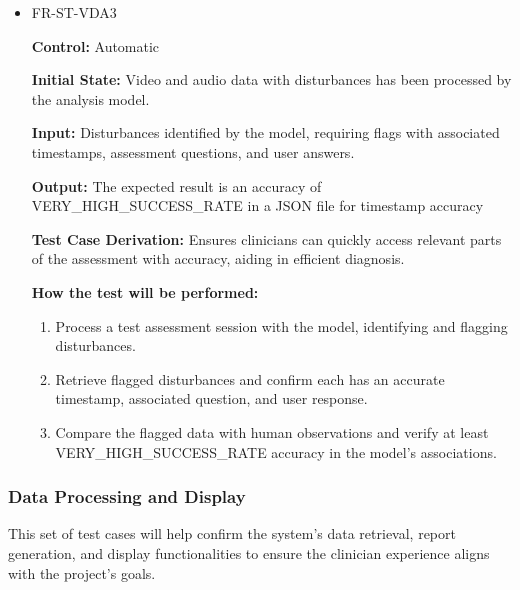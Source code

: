 \documentclass[12pt, titlepage]{article}
\begin{document}
\begin{itemize}
  \item FR-ST-VDA3
  \begin{mdframed}[linewidth=0.5mm]
      \textbf{Control:} Automatic \par
      \textbf{Initial State:} Video and audio data with disturbances has been processed by the analysis model. \par
      \textbf{Input:} Disturbances identified by the model, requiring flags with associated timestamps, assessment questions, and user answers. \par
      \textbf{Output:} The expected result is an accuracy of VERY\_HIGH\_SUCCESS\_RATE in a JSON file for timestamp accuracy\par
      \textbf{Test Case Derivation:} Ensures clinicians can quickly access relevant parts of the assessment with accuracy, aiding in efficient diagnosis. \par
      \textbf{How the test will be performed:}
      \begin{enumerate}[noitemsep]
        \item Process a test assessment session with the model, identifying and flagging disturbances.
        \item Retrieve flagged disturbances and confirm each has an accurate timestamp, associated question, and user response.
        \item Compare the flagged data with human observations and verify at least \\VERY\_HIGH\_SUCCESS\_RATE accuracy in the model’s associations.
      \end{enumerate}
  \end{mdframed}
\end{itemize}

\subsubsection{Data Processing and Display}

\hspace{2em}This set of test cases will help confirm the system's data retrieval, report generation, 
and display functionalities to ensure the clinician experience aligns with the project’s goals.
\end{document}
